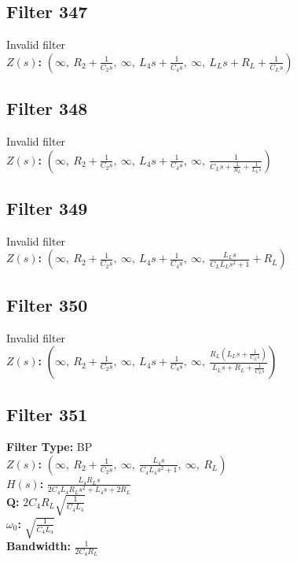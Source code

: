 \documentclass{article}
\begin{document}
\subsection*{Filter 347}
Invalid filter \\ 
\textbf{$Z(s)$:} $\left( \infty, \  R_{2} + \frac{1}{C_{2} s}, \  \infty, \  L_{4} s + \frac{1}{C_{4} s}, \  \infty, \  L_{L} s + R_{L} + \frac{1}{C_{L} s}\right)$ \\ 
\subsection*{Filter 348}
Invalid filter \\ 
\textbf{$Z(s)$:} $\left( \infty, \  R_{2} + \frac{1}{C_{2} s}, \  \infty, \  L_{4} s + \frac{1}{C_{4} s}, \  \infty, \  \frac{1}{C_{L} s + \frac{1}{R_{L}} + \frac{1}{L_{L} s}}\right)$ \\ 
\subsection*{Filter 349}
Invalid filter \\ 
\textbf{$Z(s)$:} $\left( \infty, \  R_{2} + \frac{1}{C_{2} s}, \  \infty, \  L_{4} s + \frac{1}{C_{4} s}, \  \infty, \  \frac{L_{L} s}{C_{L} L_{L} s^{2} + 1} + R_{L}\right)$ \\ 
\subsection*{Filter 350}
Invalid filter \\ 
\textbf{$Z(s)$:} $\left( \infty, \  R_{2} + \frac{1}{C_{2} s}, \  \infty, \  L_{4} s + \frac{1}{C_{4} s}, \  \infty, \  \frac{R_{L} \left(L_{L} s + \frac{1}{C_{L} s}\right)}{L_{L} s + R_{L} + \frac{1}{C_{L} s}}\right)$ \\ 
\subsection*{Filter 351}
\textbf{Filter Type:} BP \\ 
\textbf{$Z(s)$:} $\left( \infty, \  R_{2} + \frac{1}{C_{2} s}, \  \infty, \  \frac{L_{4} s}{C_{4} L_{4} s^{2} + 1}, \  \infty, \  R_{L}\right)$ \\ 
\textbf{$H(s)$:} $\frac{L_{4} R_{L} s}{2 C_{4} L_{4} R_{L} s^{2} + L_{4} s + 2 R_{L}}$ \\ 
\textbf{Q:} $2 C_{4} R_{L} \sqrt{\frac{1}{C_{4} L_{4}}}$ \\ 
\textbf{$\omega_0$:} $\sqrt{\frac{1}{C_{4} L_{4}}}$ \\ 
\textbf{Bandwidth:} $\frac{1}{2 C_{4} R_{L}}$ \\ 
\end{document}
